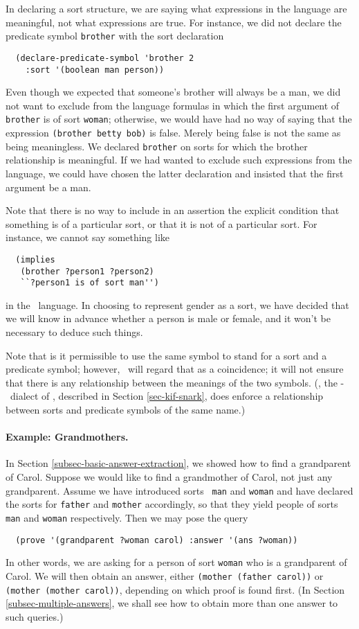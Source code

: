 In declaring a sort structure, we are saying what expressions in the
language are meaningful, not what expressions are true.  For instance,
we did not declare the predicate symbol {\tt brother} with the sort
declaration
\begin{verbatim}
  (declare-predicate-symbol 'brother 2
    :sort '(boolean man person))
\end{verbatim}
Even though we expected that someone's brother will always be a man, we
did not want to exclude from the language formulas in which the first
argument of {\tt brother} is of sort {\tt woman}; otherwise, we would
have had no way of saying that the expression \verb|(brother betty bob)|
is false.  Merely being false is not the same as being meaningless.
We declared {\tt brother} on sorts for which the brother
relationship is meaningful.  If we had wanted to exclude such expressions
from the language, we could have chosen the latter declaration and insisted
that the first argument be a man.

Note that there is no way to include in an assertion the explicit
condition that something is of a particular sort, or that it is not of
a particular sort.  For instance, we cannot say something like
\begin{verbatim}
  (implies
   (brother ?person1 ?person2)
   ``?person1 is of sort man'')
\end{verbatim}
in the \snark\  language.
In choosing to represent gender as a sort, we have decided that we
will know in advance whether a person is male or female, and it won't
be necessary to deduce such things.

Note that is it permissible to use the same symbol to stand for a sort and a
predicate symbol; however, \snark\  will regard that as a coincidence; it will
not ensure that there is any relationship between the meanings of the two
symbols.  (\Kifsnark\/, the \kif\/-\okbc\ dialect of \snark\/, described
in Section
\ref{sec-kif-snark}, does enforce a relationship between sorts and predicate
symbols of the same name.)

\paragraph{Example: Grandmothers.}
\label{example-grandmothers}  In Section
\ref{subsec-basic-answer-extraction}, we showed how to find a
grandparent of Carol.  Suppose we would like to find a grandmother of
Carol, not just any grandparent.  Assume we have introduced sorts {\tt
man} and {\tt woman} and have declared the sorts for {\tt father} and
{\tt mother} accordingly, so that they yield people of sorts {\tt man}
and {\tt woman} respectively.  Then we may pose the query
\begin{verbatim}
  (prove '(grandparent ?woman carol) :answer '(ans ?woman))
\end{verbatim}
In other words, we are asking for a person of sort {\tt woman} who is
a grandparent of Carol.  We will then obtain an answer, either
\verb|(mother (father carol))| or \verb|(mother (mother carol))|,
depending on which proof is found first.  (In Section
\ref{subsec-multiple-answers}, we shall see how to obtain more than
one answer to such queries.)


